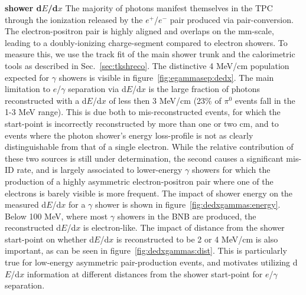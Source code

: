 \documentclass[a4paper]{article}
\begin{document}
\par \textbf{shower d$E$/d$x$} The majority of photons manifest themselves in the TPC through the ionization released by the $e^+$/$e^-$ pair produced via pair-conversion. The electron-positron pair is highly aligned and overlaps on the mm-scale, leading to a doubly-ionizing charge-segment compared to electron showers. To measure this, we use the track fit of the main shower trunk and the calorimetric tools as described in Sec.~\ref{sec:tkshreco}. 
The distinctive 4 MeV/cm population expected for $\gamma$ showers is visible in figure~\ref{fig:egammasep:dedx}. The main limitation to $e$/$\gamma$ separation via d$E$/d$x$ is the large fraction of photons reconstructed with a d$E$/d$x$ of less then 3 MeV/cm (23\% of $\pi^0$ events fall in the 1-3 MeV range). This is due both to mis-reconstructed events, for which the start-point is incorrectly reconstructed by more than one or two cm, and to events where the photon shower's energy loss-profile is not as clearly distinguishable from that of a single electron. While the relative contribution of these two sources is still under determination, the second causes a significant mis-ID rate, and is largely associated to lower-energy $\gamma$ showers for which the production of a highly asymmetric electron-positron pair where one of the electrons is barely visible is more frequent. The impact of shower energy on the measured d$E$/d$x$ for a $\gamma$ shower is shown in figure~\ref{fig:dedxgammas:energy}. Below 100 MeV, where most $\gamma$ showers in the BNB are produced, the reconstructed d$E$/d$x$ is electron-like. The impact of distance from the shower start-point on whether d$E$/d$x$ is reconstructed to be 2 or 4 MeV/cm is also important, as can be seen in figure~\ref{fig:dedxgammas:dist}. This is particularly true for low-energy asymmetric pair-production events, and motivates utilizing 
d$E$/d$x$ information at different distances from the shower start-point for $e$/$\gamma$ separation.
\end{document}

